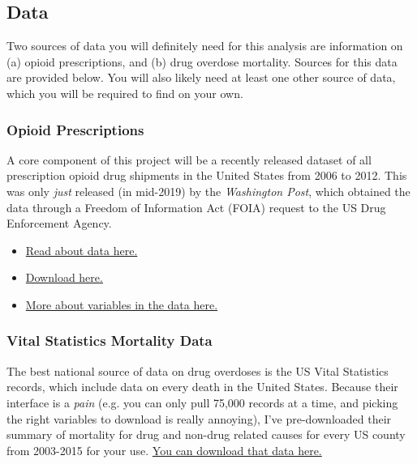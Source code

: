 \documentclass[12pt]{article}
\begin{document}
\subsection*{Data}

Two sources of data you will definitely need for this analysis are information on (a) opioid prescriptions, and (b) drug overdose mortality. Sources for this data are provided below. You will also likely need at least one other source of data, which you will be required to find on your own.

\subsubsection*{Opioid Prescriptions}

A core component of this project will be a recently released dataset of all prescription opioid drug shipments in the United States from 2006 to 2012. This was only \emph{just} released (in mid-2019) by the \emph{Washington Post}, which obtained the data through a Freedom of Information Act (FOIA) request to the US Drug Enforcement Agency.

\begin{itemize}
  \item \href{https://www.washingtonpost.com/graphics/2019/investigations/dea-pain-pill-database/}{Read about data here.}
  \item \href{https://www.washingtonpost.com/national/2019/07/18/how-download-use-dea-pain-pills-database/?arc404=true}{Download here.}
  \item \href{https://github.com/wpinvestigative/arcos-api/blob/master/data/data_dictionary.csv}{More about variables in the data here.}
\end{itemize}

\subsubsection*{Vital Statistics Mortality Data}

The best national source of data on drug overdoses is the US Vital Statistics records, which include data on every death in the United States. Because their interface is a \emph{pain} (e.g. you can only pull 75,000 records at a time, and picking the right variables to download is really annoying), I've pre-downloaded their summary of mortality for drug and non-drug related causes for every US county from 2003-2015 for your use. \href{https://www.dropbox.com/s/kad4dwebr88l3ud/US_VitalStatistics.zip?dl=0}{You can download that data here.}
\end{document}
